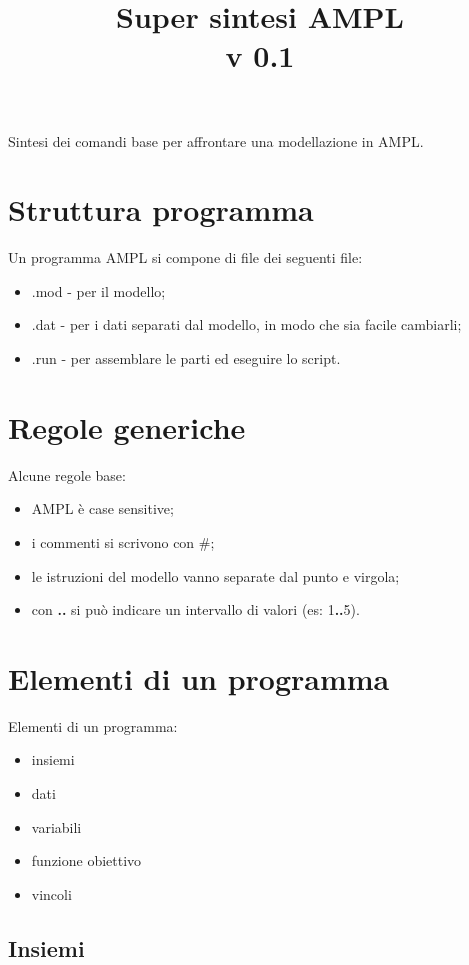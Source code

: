 

\title{Super sintesi AMPL \\ v 0.1}
\date{}



\maketitle
Sintesi dei comandi base per affrontare una modellazione in AMPL. 

\section{Struttura programma}
Un programma AMPL si compone di file dei seguenti file:
\begin{itemize}
\item .mod - per il modello;
\item .dat - per i dati separati dal modello, in modo che sia facile cambiarli;
\item .run - per assemblare le parti ed eseguire lo script.
\end{itemize}

\section{Regole generiche}
Alcune regole base:
\begin{itemize}
\item AMPL è case sensitive;
\item i commenti si scrivono con \#;
\item le istruzioni del modello vanno separate dal punto e virgola;
\item con \textbf{..} si può indicare un intervallo di valori (es: 1\textbf{..}5).
\end{itemize}

\section{Elementi di un programma}
Elementi di un programma:
\begin{itemize}
\item insiemi
\item dati
\item variabili
\item funzione obiettivo
\item vincoli
\end{itemize}

\subsection{Insiemi}

